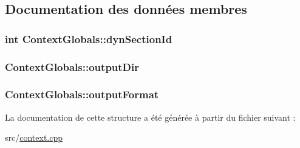 \subsection{Documentation des données membres}
\hypertarget{struct_context_globals_aa8f55e29c7473839278831567228fed2}{}
\subsubsection[{dyn\+Section\+Id}]{\setlength{\rightskip}{0pt plus 5cm}int Context\+Globals\+::dyn\+Section\+Id}\label{struct_context_globals_aa8f55e29c7473839278831567228fed2}
\hypertarget{struct_context_globals_a258997491223c384351384e24c73a63e}{}
\subsubsection[{output\+Dir}]{ Context\+Globals\+::output\+Dir}\label{struct_context_globals_a258997491223c384351384e24c73a63e}
\hypertarget{struct_context_globals_abe47e0b334f66da7db51ac85285abaa1}{}
\subsubsection[{output\+Format}]{ Context\+Globals\+::output\+Format}\label{struct_context_globals_abe47e0b334f66da7db51ac85285abaa1}


La documentation de cette structure a été générée à partir du fichier suivant \+:\begin{DoxyCompactItemize}
\item 
src/\hyperlink{context_8cpp}{context.\+cpp}\end{DoxyCompactItemize}
